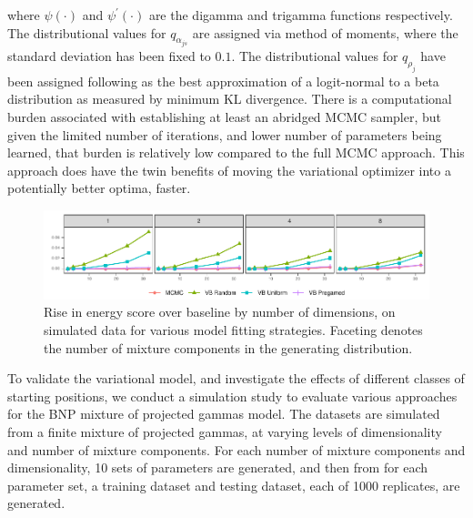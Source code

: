     where $\psi(\cdot)$ and $\psi^{\prime}(\cdot)$ are the digamma and trigamma functions
    respectively.  The distributional values for $q_{\alpha_{js}}$ are assigned via method
    of moments, where the standard deviation has been fixed to $0.1$.  The distributional
    values for $q_{\rho_j}$ have been assigned following \cite{aitchison1980} as the best
    approximation of a logit-normal to a beta distribution as measured by minimum KL 
    divergence.  There is a computational burden associated with establishing at least an
    abridged MCMC sampler, but given the limited number of iterations, and lower number of
    parameters being learned, that burden is relatively low compared to the full MCMC 
    approach. This approach does have the twin benefits of moving the variational 
    optimizer into a potentially better optima, faster.

\begin{figure}[tb]
    \centering
    \includegraphics[width=0.95\linewidth]{plots/energy_score}
    \caption{Rise in energy score over baseline by number of dimensions, on simulated data 
    for various model fitting strategies. Faceting denotes the number of mixture components 
    in the generating distribution.\label{fig:energyscore}}
\end{figure}

To validate the variational model, and investigate the effects of different classes of 
    starting positions, we conduct a simulation study to evaluate various approaches for
    the BNP mixture of projected gammas model.  The datasets are simulated from a finite
    mixture of projected gammas, at varying levels of dimensionality and number of mixture
    components.  For each number of mixture components and dimensionality, 10 sets of
    parameters are generated, and then from for each parameter set, a training dataset and 
    testing dataset, each of \num{1000} replicates, are generated.

